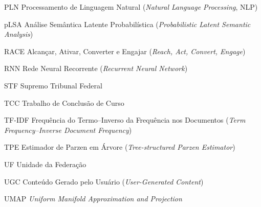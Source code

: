 \begin{siglas}
    \item[PLN] Processamento de Linguagem Natural (\textit{Natural Language Processing}, NLP)
    \item[pLSA] Análise Semântica Latente Probabilística (\textit{Probabilistic Latent Semantic Analysis})
    \item[RACE] Alcançar, Ativar, Converter e Engajar (\textit{Reach, Act, Convert, Engage})
    \item[RNN] Rede Neural Recorrente (\textit{Recurrent Neural Network})
    \item[STF] Supremo Tribunal Federal
    \item[TCC] Trabalho de Conclusão de Curso
    \item[TF-IDF] Frequência do Termo--Inverso da Frequência nos Documentos (\textit{Term Frequency--Inverse Document Frequency})
    \item[TPE] Estimador de Parzen em Árvore (\textit{Tree-structured Parzen Estimator})
    \item[UF] Unidade da Federação
    \item[UGC] Conteúdo Gerado pelo Usuário (\textit{User-Generated Content})
    \item[UMAP] \textit{Uniform Manifold Approximation and Projection}
\end{siglas}

